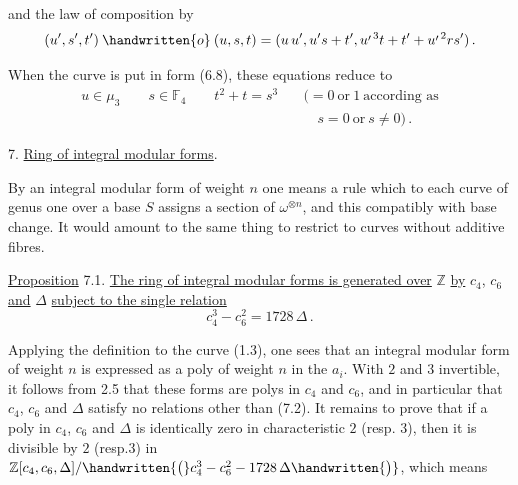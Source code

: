 %
%
and the law of composition by
\[
(u',s',t')\mathbin{\handwritten{o}}(u,s,t)
=(u\,u',u's+t',u^{\raisebox{-.38ex}{$\scriptstyle\prime$}\,3}t+t'+u^{\raisebox{-.38ex}{$\scriptstyle\prime$}\,2}rs')\, .
\]

When the curve is put in form (6.8), these equations reduce to
\[
\begin{aligned}
u\in\mu_3 \qquad s\in\mathbb{F}_4 \qquad t^2+t=s^3
 &\quad ({}=0\ \text{or}\ 1\ \text{according as}\\
 &\qquad s=0\ \text{or}\ s\ne 0) \, .
\end{aligned}
\]

7. \quad \uline{Ring of integral modular forms}.

By an integral modular form of weight $n$ one means a rule which to each curve of genus one over a base $S$ assigns a section of $\omega^{\otimes n}$, and this compatibly with base change. It would amount to the same thing to restrict to curves without additive fibres.

\uline{Proposition} 7.1. \quad \uline{The ring of integral modular forms is generated over} $\mathbb{Z}$ \uline{by} $c_4$, $c_6$ \uline{and} $\Delta$ \uline{subject to the single relation}
\[
c_4^3-c_6^2=1728\,\Delta \, . \tag*{(7.2.)}
\]

Applying the definition to the curve (1.3), one sees that an integral modular form of weight $n$ is expressed as a poly of weight $n$ in the $a_i$. With $2$ and $3$ invertible, it follows from 2.5 that these forms are  polys in $c_4$ and $c_6$, and in particular that $c_4$, $c_6$ and $\Delta$ satisfy no relations other than (7.2). It remains to prove that if a poly in $c_4$, $c_6$ and $\Delta$ is identically zero in characteristic $2$ (resp. $3$), then it is divisible by $2$ (resp.$3$) in $\mathbb{Z}[c_4,c_6,\Delta]/\handwritten{\bigl(}c_4^3-c_6^2-1728\,\Delta\handwritten{\bigr)}$, which means%
